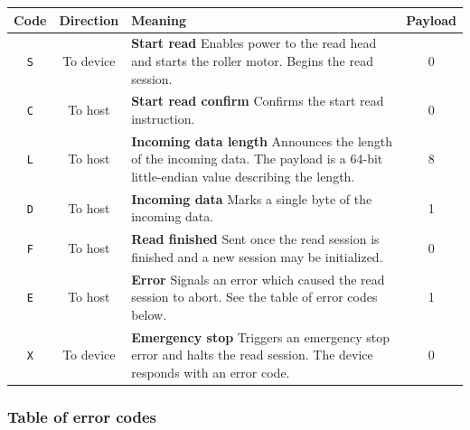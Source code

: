 \documentclass{article}
\begin{document}
	\begin{center}
		\begin{tabular}{ |c|c|p{7cm}|c| }
		\hline
			Code & Direction & Meaning & Payload \\
		\hline
			\texttt{S} &
			To device &
			\textbf{Start read}\newline
			Enables power to the read head and starts the roller motor. Begins
			the read session.
			& 0 \\
		\hline
			\texttt{C} &
			To host &
			\textbf{Start read confirm}\newline
			Confirms the start read instruction.
			& 0 \\
		\hline
			\texttt{L} &
			To host &
			\textbf{Incoming data length}\newline
			Announces the length of the incoming data. The payload is a 64-bit
			little-endian value describing the length.
			& 8 \\
		\hline
			\texttt{D} &
			To host &
			\textbf{Incoming data}\newline
			Marks a single byte of the incoming data.
			& 1 \\
		\hline
			\texttt{F} &
			To host &
			\textbf{Read finished}\newline
			Sent once the read session is finished and a new session may be
			initialized.
			& 0 \\
		\hline
			\texttt{E} &
			To host &
			\textbf{Error}\newline
			Signals an error which caused the read session to abort. See the
			table of error codes below.
			& 1 \\
		\hline
			\texttt{X} &
			To device &
			\textbf{Emergency stop}\newline
			Triggers an emergency stop error and halts the read session. The
			device responds with an error code.
			& 0 \\
		\hline
		\end{tabular}
	\end{center}
	
	\subsubsection{Table of error codes}
	
\end{document}
